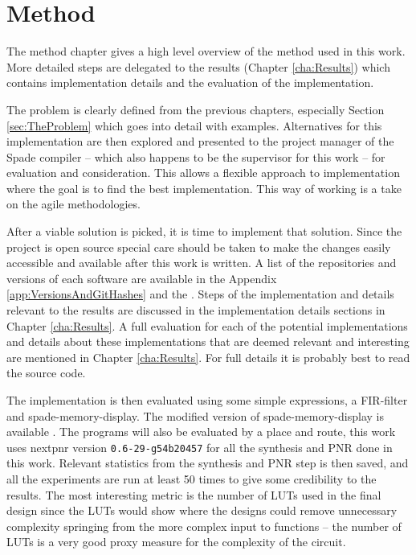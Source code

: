 \chapter{Method}
The method chapter gives a high level overview of the method used in this work. More detailed steps are delegated to the results (Chapter \ref{cha:Results}) which contains implementation details and the evaluation of the implementation.

The problem is clearly defined from the previous chapters, especially Section \ref{sec:TheProblem} which goes into detail with examples. Alternatives for this implementation are then explored and presented to the project manager of the Spade compiler -- which also happens to be the supervisor for this work -- for evaluation and consideration. This allows a flexible approach to implementation where the goal is to find the best implementation. This way of working is a take on the agile methodologies.

After a viable solution is picked, it is time to implement that solution. Since the project is open source special care should be taken to make the changes easily accessible and available after this work is written. A list of the repositories and versions of each software are available in the Appendix \ref{app:VersionsAndGitHashes} and the . Steps of the implementation and details relevant to the results are discussed in the implementation details sections in Chapter \ref{cha:Results}. A full evaluation for each of the potential implementations and details about these implementations that are deemed relevant and interesting are mentioned in Chapter \ref{cha:Results}. For full details it is probably best to read the source code. 

The implementation is then evaluated using some simple expressions, a FIR-filter  and spade-memory-display. The modified version of spade-memory-display is available . The programs will also be evaluated by a place and route, this work uses nextpnr version \verb+0.6-29-g54b20457+ for all the synthesis and PNR done in this work. Relevant statistics from the synthesis and PNR step is then saved, and all the experiments are run at least 50 times to give some credibility to the results. The most interesting metric is the number of LUTs used in the final design since the LUTs would show where the designs could remove unnecessary complexity springing from the more complex input to functions -- the number of LUTs is a very good proxy measure for the complexity of the circuit.

